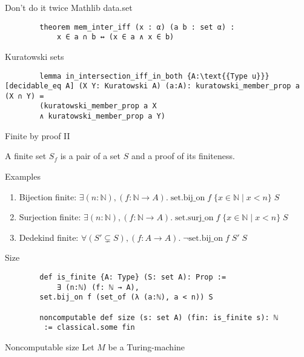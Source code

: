 \documentclass{beamer}
\begin{document}
    \begin{frame}[fragile]{Don't do it twice}
        Mathlib data.set
        \begin{lstlisting}
        theorem mem_inter_iff (x : α) (a b : set α) :
            x ∈ a ∩ b ↔ (x ∈ a ∧ x ∈ b)
        \end{lstlisting}
        Kuratowski sets
        \begin{lstlisting}
        lemma in_intersection_iff_in_both {A:\text{{Type u}}} [decidable_eq A] (X Y: Kuratowski A) (a:A): kuratowski_member_prop a (X ∩ Y) = 
        (kuratowski_member_prop a X 
        ∧ kuratowski_member_prop a Y)
        \end{lstlisting}

    \end{frame}
    \begin{frame}{Finite by proof II}
        \begin{definition}
            A finite set $S_f$ is a pair of a set $S$ and a proof of its finiteness.
        \end{definition}
        \pause
        Examples
        \begin{enumerate}
            \item Bijection finite: $\exists (n:\mathbb{N}), (f: \mathbb{N} \to A).\; \text{{set.bij\_on}}\; f \;\{ x \in \mathbb{N} \mid x < n\} \;S$
            \item Surjection finite: $\exists (n:\mathbb{N}), (f: \mathbb{N} \to A).\; \text{{set.surj\_on}}\; f \;\{ x \in \mathbb{N} \mid x < n\} \;S $
            \item Dedekind finite: $\forall (S' \subsetneq S), (f: A \to A).\; \neg \text{{set.bij\_on}}\; f\; S'\; S$
        \end{enumerate}
    \end{frame}
    \begin{frame}[fragile]{Size}
        \begin{lstlisting}
        def is_finite {A: Type} (S: set A): Prop := 
            ∃ (n:ℕ) (f: ℕ → A), 
        set.bij_on f (set_of (λ (a:ℕ), a < n)) S

        noncomputable def size (s: set A) (fin: is_finite s): ℕ
         := classical.some fin
    \end{lstlisting}
    \end{frame}

    \begin{frame}{Noncomputable size}
        Let $M$ be a Turing-machine
    \end{frame}
    
\end{document}
